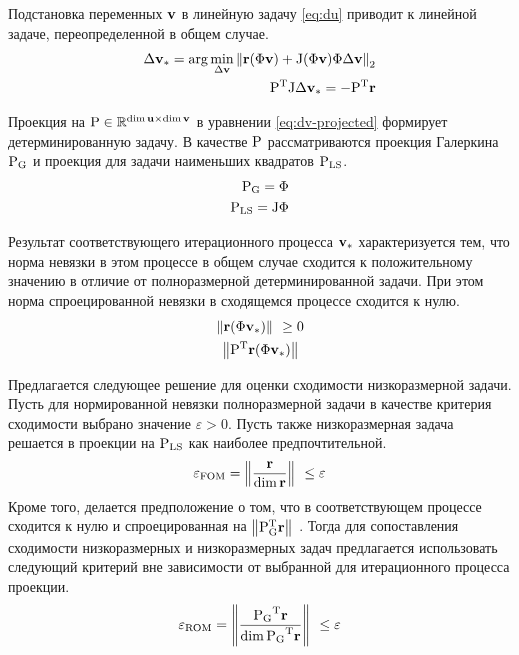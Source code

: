 Подстановка переменных $\mathbf{v}$ в линейную задачу \ref{eq:du} приводит к линейной задаче, переопределенной в общем случае.
\begin{align}
    \dvunk_\ast = \arg \min_{\dvunk} \norm[2]{\resid(\Phi \vunk) + \jac(\Phi \vunk) \Phi \dvunk} \label{eq:dv}\\
    \transpose{P}\jac \dvunk_\ast = - \transpose{P} \resid \label{eq:dv-projected}
\end{align}

Проекция на $\matr{P} \in \mathbb{R}^{\dim \unk \times \dim \vunk}$ в уравнении \ref{eq:dv-projected} формирует детерминированную задачу.
В качестве $\matr{P}$ рассматриваются проекция Галеркина $\matr{P}_\text{G}$ и проекция для задачи наименьших квадратов $\matr{P}_\text{LS}$.
\begin{align}
    \matr{P}_\text{G} = \Phi \\
    \matr{P}_\text{LS} = \jac \Phi \\
\end{align}

Результат соответствующего итерационного процесса $\mathbf{v}_\ast$ характеризуется тем, что норма невязки в этом процессе в общем случае сходится к положительному значению в отличие от полноразмерной детерминированной задачи. При этом норма спроецированной невязки в сходящемся процессе сходится к нулю.
\begin{align}
    \norm{\resid(\Phi \vunk_\ast)} \geq 0\\
    \norm{\transpose{P}\resid(\Phi \vunk_\ast)}
\end{align}

Предлагается следующее решение для оценки сходимости низкоразмерной задачи.
Пусть для нормированной невязки полноразмерной задачи в качестве критерия сходимости выбрано значение $\varepsilon > 0$. Пусть также низкоразмерная задача решается в проекции на $\matr{P}_{\text{LS}}$ как наиболее предпочтительной.
\begin{equation}
    \varepsilon_\text{FOM} = \left\| \frac{\mathbf{r}}{\dim{\mathbf{r}}} \right\|_{~} \leq \varepsilon \\
\end{equation}
Кроме того, делается предположение о том, что в соответствующем процессе сходится к нулю и спроецированная на $\norm{\transpose{P}_\text{G}\resid}$. Тогда для сопоставления сходимости низкоразмерных и низкоразмерных задач предлагается использовать следующий критерий вне зависимости от выбранной для итерационного процесса проекции.
\begin{equation}
    \varepsilon_\text{ROM} = \norm{\frac{\transpose{\matr{P}_\text{G}}\resid}{\dim{ \transpose{\matr{P}_\text{G}}\resid}}} \leq \varepsilon
\end{equation}


